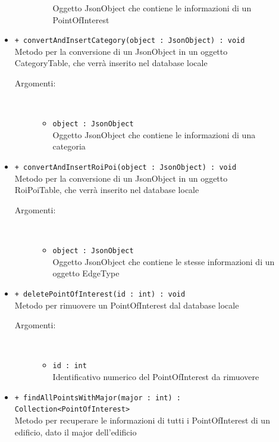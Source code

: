 \documentclass[../DefinizioneDiProdotto.tex]{subfiles}
\begin{document}
\begin{description}
\begin{itemize}
\begin{description}
\begin{itemize}
				Oggetto JsonObject che contiene le informazioni di un PointOfInterest\end{itemize}
		\end{description}
		\item \texttt{+ convertAndInsertCategory(object : JsonObject) : void}\\
		Metodo per la conversione di un JsonObject in un oggetto CategoryTable, che verrà inserito nel database locale
		\begin{description}
			\item[Argomenti:] \
			\begin{itemize}
				\item \texttt{object : JsonObject}\\
				Oggetto JsonObject che contiene le informazioni di una categoria\end{itemize}
		\end{description}
		\item \texttt{+ convertAndInsertRoiPoi(object : JsonObject) : void}\\
		Metodo per la conversione di un JsonObject in un oggetto RoiPoiTable, che verrà inserito nel database locale
		\begin{description}
			\item[Argomenti:] \
			\begin{itemize}
				\item \texttt{object : JsonObject}\\
				Oggetto JsonObject che contiene le stesse informazioni di un oggetto EdgeType\end{itemize}
		\end{description}
		\item \texttt{+ deletePointOfInterest(id : int) : void}\\
		Metodo per rimuovere un PointOfInterest dal database locale
		\begin{description}
			\item[Argomenti:] \
			\begin{itemize}
				\item \texttt{id : int}\\
				Identificativo numerico del PointOfInterest da rimuovere\end{itemize}
		\end{description}
		\item \texttt{+ findAllPointsWithMajor(major : int) : Collection<PointOfInterest>}\\
		Metodo per recuperare le informazioni di tutti i PointOfInterest di un edificio, dato il major dell'edificio

\end{itemize}
\end{description}
\end{document}
